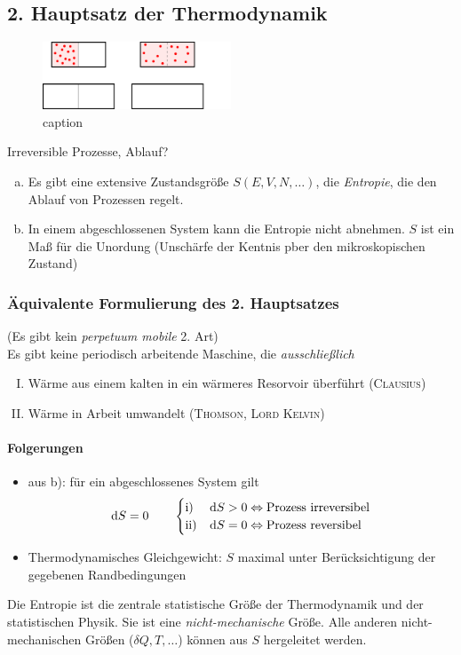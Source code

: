 \subsection{2. Hauptsatz der Thermodynamik}
\begin{figure}[H]
\begin{center}
  \includegraphics[width=0.5\textwidth]{../img/irrevProcess.pdf}
  \caption{caption}  %
  \label{img:irrevProcess}
\end{center}
\end{figure}
Irreversible Prozesse, Ablauf?
\begin{enumerate}[a)]
    \item Es gibt eine extensive Zustandsgröße $S(E, V, N, \ldots)$, die \emph{Entropie}, die den Ablauf von Prozessen regelt.
    \item In einem abgeschlossenen System kann die Entropie nicht abnehmen. $S$ ist ein Maß für die Unordung
    (Unschärfe der Kentnis pber den mikroskopischen Zustand)
\end{enumerate}

\subsubsection{Äquivalente Formulierung des 2. Hauptsatzes}
(Es gibt kein \emph{perpetuum mobile} 2. Art) \\
Es gibt keine periodisch arbeitende Maschine, die \emph{ausschließlich}
\begin{enumerate}[I.]
    \item Wärme aus einem kalten in ein wärmeres Resorvoir überführt (\textsc{Clausius})
    \item Wärme in Arbeit umwandelt (\textsc{Thomson}, \textsc{Lord Kelvin})
\end{enumerate}
\paragraph{Folgerungen}
\begin{itemize}
    \item aus b): für ein abgeschlossenes System gilt
    \begin{equation}
        \mathrm{d} S = 0 \qquad
        \begin{cases}
            \text{i) } & \mathrm{d} S > 0 \Leftrightarrow \text{Prozess irreversibel} \\
            \text{ii)} & \mathrm{d} S = 0 \Leftrightarrow \text{Prozess reversibel}
        \end{cases}
    \end{equation}
    \item Thermodynamisches Gleichgewicht: $S$ maximal unter Berücksichtigung der gegebenen Randbedingungen
\end{itemize}
Die Entropie ist die zentrale statistische Größe der Thermodynamik und der statistischen Physik. Sie ist eine \emph{nicht-mechanische} Größe.
Alle anderen nicht-mechanischen Größen ($\delta Q, T, \ldots$) können aus $S$ hergeleitet werden.
